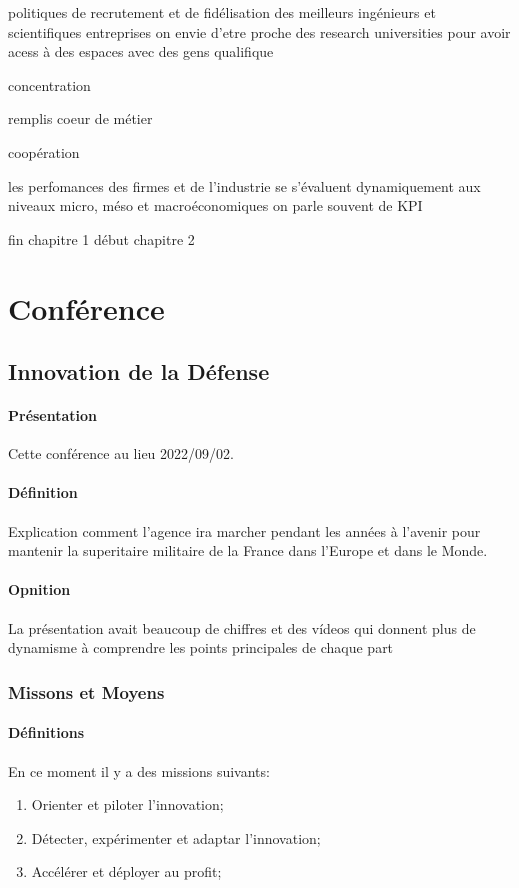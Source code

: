\documentclass{article}
\begin{document}
politiques de recrutement et de fidélisation des meilleurs ingénieurs et scientifiques
entreprises on envie d'etre proche des research universities pour avoir acess à des espaces avec des gens qualifique


concentration



remplis coeur de métier



coopération


les perfomances des firmes et de l'industrie se s'évaluent dynamiquement aux niveaux micro, méso et macroéconomiques
on parle souvent de KPI

fin chapitre 1
début chapitre 2




\newpage\section{Conférence}
\subsection{Innovation de la Défense}
\paragraph{Présentation} Cette conférence au lieu 2022/09/02.

\paragraph{Définition}Explication comment l'agence ira marcher pendant les années à l'avenir pour mantenir la superitaire militaire de la France dans l'Europe et dans le Monde.

\paragraph{Opnition}La présentation avait beaucoup de chiffres et des vídeos qui donnent plus de dynamisme à comprendre les points principales de chaque part

\subsubsection{Missons et Moyens}
\paragraph{Définitions}En ce moment il y a des missions suivants:
\begin{enumerate}[noitemsep]
    \item Orienter et piloter l'innovation;
    \item Détecter, expérimenter et adaptar l'innovation;
    \item Accélérer et déployer au profit;
\end{enumerate}
\end{document}

